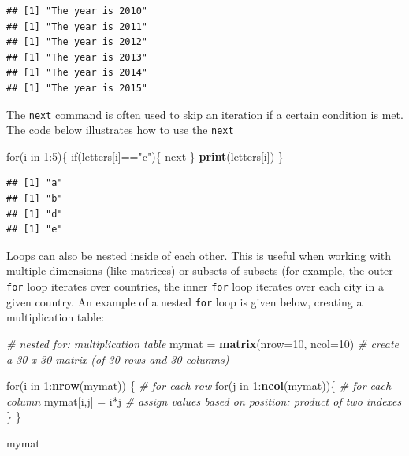 \documentclass[]{book}
\newenvironment{Shaded}{\begin{snugshade}}{\end{snugshade}}
\newcommand{\KeywordTok}[1]{\textcolor[rgb]{0.13,0.29,0.53}{\textbf{{#1}}}}
\newcommand{\DataTypeTok}[1]{\textcolor[rgb]{0.13,0.29,0.53}{{#1}}}
\newcommand{\DecValTok}[1]{\textcolor[rgb]{0.00,0.00,0.81}{{#1}}}
\newcommand{\StringTok}[1]{\textcolor[rgb]{0.31,0.60,0.02}{{#1}}}
\newcommand{\CommentTok}[1]{\textcolor[rgb]{0.56,0.35,0.01}{\textit{{#1}}}}
\newcommand{\NormalTok}[1]{{#1}}
\begin{document}
\begin{verbatim}
## [1] "The year is 2010"
## [1] "The year is 2011"
## [1] "The year is 2012"
## [1] "The year is 2013"
## [1] "The year is 2014"
## [1] "The year is 2015"
\end{verbatim}

The \texttt{next} command is often used to skip an iteration if a
certain condition is met. The code below illustrates how to use the
\texttt{next}

\begin{Shaded}
\begin{Highlighting}[]
\NormalTok{for(i in }\DecValTok{1}\NormalTok{:}\DecValTok{5}\NormalTok{)\{}
  \NormalTok{if(letters[i]==}\StringTok{"c"}\NormalTok{)\{}
    \NormalTok{next}
  \NormalTok{\}}
  \KeywordTok{print}\NormalTok{(letters[i])}
\NormalTok{\}}
\end{Highlighting}
\end{Shaded}

\begin{verbatim}
## [1] "a"
## [1] "b"
## [1] "d"
## [1] "e"
\end{verbatim}

Loops can also be nested inside of each other. This is useful when
working with multiple dimensions (like matrices) or subsets of subsets
(for example, the outer \texttt{for} loop iterates over countries, the
inner \texttt{for} loop iterates over each city in a given country. An
example of a nested \texttt{for} loop is given below, creating a
multiplication table:

\begin{Shaded}
\begin{Highlighting}[]
\CommentTok{# nested for: multiplication table}
\NormalTok{mymat =}\StringTok{ }\KeywordTok{matrix}\NormalTok{(}\DataTypeTok{nrow=}\DecValTok{10}\NormalTok{, }\DataTypeTok{ncol=}\DecValTok{10}\NormalTok{) }\CommentTok{# create a 30 x 30 matrix (of 30 rows and 30 columns)}

\NormalTok{for(i in }\DecValTok{1}\NormalTok{:}\KeywordTok{nrow}\NormalTok{(mymat)) \{  }\CommentTok{# for each row}
  \NormalTok{for(j in }\DecValTok{1}\NormalTok{:}\KeywordTok{ncol}\NormalTok{(mymat))\{ }\CommentTok{# for each column}
    \NormalTok{mymat[i,j] =}\StringTok{ }\NormalTok{i*j     }\CommentTok{# assign values based on position: product of two indexes}
  \NormalTok{\}}
\NormalTok{\}}

\NormalTok{mymat}
\end{Highlighting}
\end{Shaded}
\end{document}
